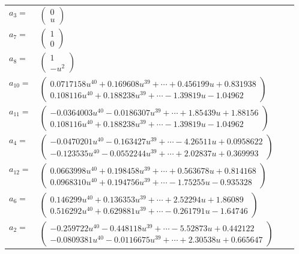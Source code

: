 \documentclass[1p]{elsarticle_modified}
\theoremstyle{definition}
\begin{document}
\begin{tabular}{m{7pt} m{180pt} m{7pt} m{180pt} }
\flushright $a_{3}=$&$\begin{pmatrix}0\\u\end{pmatrix}$ \\
\flushright $a_{7}=$&$\begin{pmatrix}1\\0\end{pmatrix}$ \\
\flushright $a_{8}=$&$\begin{pmatrix}1\\- u^2\end{pmatrix}$ \\
\flushright $a_{10}=$&$\begin{pmatrix}0.0717158 u^{40}+0.169608 u^{39}+\cdots+0.456199 u+0.831938\\0.108116 u^{40}+0.188238 u^{39}+\cdots-1.39819 u-1.04962\end{pmatrix}$ \\
\flushright $a_{11}=$&$\begin{pmatrix}-0.0364003 u^{40}-0.0186307 u^{39}+\cdots+1.85439 u+1.88156\\0.108116 u^{40}+0.188238 u^{39}+\cdots-1.39819 u-1.04962\end{pmatrix}$ \\
\flushright $a_{4}=$&$\begin{pmatrix}-0.0470201 u^{40}-0.163427 u^{39}+\cdots-4.26511 u+0.0958622\\-0.123535 u^{40}-0.0552244 u^{39}+\cdots+2.02837 u+0.369993\end{pmatrix}$ \\
\flushright $a_{12}=$&$\begin{pmatrix}0.0663998 u^{40}+0.198458 u^{39}+\cdots+0.563678 u+0.814168\\0.0968310 u^{40}+0.194756 u^{39}+\cdots-1.75255 u-0.935328\end{pmatrix}$ \\
\flushright $a_{6}=$&$\begin{pmatrix}0.146299 u^{40}+0.136353 u^{39}+\cdots+2.52294 u+1.86089\\0.516292 u^{40}+0.629881 u^{39}+\cdots-0.261791 u-1.64746\end{pmatrix}$ \\
\flushright $a_{2}=$&$\begin{pmatrix}-0.259722 u^{40}-0.448118 u^{39}+\cdots-5.52873 u+0.442122\\-0.0809381 u^{40}-0.0116675 u^{39}+\cdots+2.30538 u+0.665647\end{pmatrix}$ \\

\end{tabular}
\end{document}
